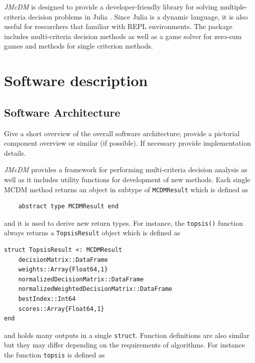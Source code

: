 \documentclass[authoryear,preprint,review,12pt]{elsarticle}
\begin{document}
\emph{JMcDM} is designed to provide a developer-friendly library for solving multiple-criteria decision problems in Julia \cite{julia}. Since Julia is a dynamic language, it is also useful for researchers that familiar with REPL environments. The package includes multi-criteria decision methods as well as a game solver for zero-sum games and methods for single criterion methods. 

\section{Software description}
\label{sec:software_description}



\subsection{Software Architecture}
\label{section:softwareArch}
{\color{red}Give a short overview of the overall software architecture; provide a pictorial component 
overview or similar (if possible). If necessary provide implementation details.}

\emph{JMcDM} provides a framework for performing multi-criteria decision analysis as well as it includes utility functions for development of new methods. Each single MCDM method returns an object in subtype of \texttt{MCDMResult} which is defined as 

\begin{verbatim}
	abstract type MCDMResult end
\end{verbatim}

\noindent and it is used to derive new return types. For instance, the \texttt{topsis()} function always returns a \texttt{TopsisResult} object which is defined as 

\begin{verbatim}
struct TopsisResult <: MCDMResult
    decisionMatrix::DataFrame
    weights::Array{Float64,1}
    normalizedDecisionMatrix::DataFrame
    normalizedWeightedDecisionMatrix::DataFrame 
    bestIndex::Int64 
    scores::Array{Float64,1}
end
\end{verbatim}

\noindent and holds many outputs in a single \texttt{struct}. Function definitions are also similar but they may differ depending on the requirements of algorithms. For instance the function \texttt{topsis} is defined as
\end{document}

